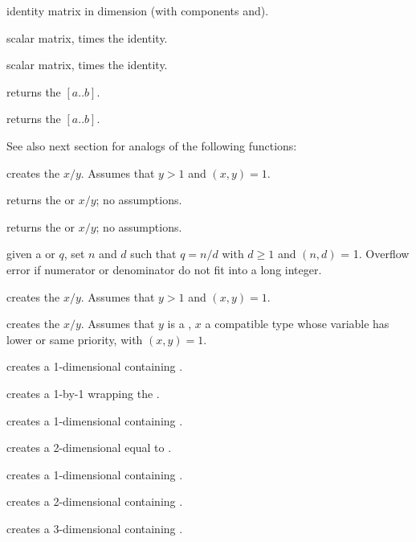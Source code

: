  identity matrix in dimension  (with
components  and).

 scalar matrix,  times the identity.

 scalar matrix,  times
the identity.

 returns the  $[a..b]$.

 returns the  $[a..b]$.

\smallskip
See also next section for analogs of the following functions:

 creates the  $x/y$. Assumes that
$y > 1$ and $(x,y) = 1$.

 returns the  or  $x/y$;
no assumptions.

 returns the  or  $x/y$;
no assumptions.

 given a  or  $q$,
set $n$ and $d$ such that $q = n/d$ with $d \geq 1$ and $(n,d)$ = 1. Overflow
error if numerator or denominator do not fit into a long integer.

 creates the  $x/y$. Assumes that
$y > 1$ and $(x,y) = 1$.

 creates the  $x/y$.
Assumes that $y$ is a , $x$ a compatible type whose variable has
lower or same priority, with $(x,y) = 1$.

 creates a 1-dimensional  containing
.

 creates a 1-by-1  wrapping the 
.

 creates a 1-dimensional  containing
.

 creates a 2-dimensional  equal
to \kbd{[x,y]}.

 creates a 1-dimensional 
containing .

 creates a 2-dimensional 
containing .

 creates a 3-dimensional 
containing .

